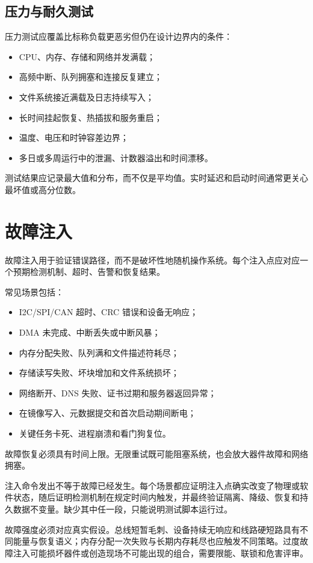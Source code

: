 \subsection{压力与耐久测试}

压力测试应覆盖比标称负载更恶劣但仍在设计边界内的条件：
\begin{itemize}
  \item CPU、内存、存储和网络并发满载；
  \item 高频中断、队列拥塞和连接反复建立；
  \item 文件系统接近满载及日志持续写入；
  \item 长时间挂起恢复、热插拔和服务重启；
  \item 温度、电压和时钟容差边界；
  \item 多日或多周运行中的泄漏、计数器溢出和时间漂移。
\end{itemize}

测试结果应记录最大值和分布，而不仅是平均值。实时延迟和启动时间通常更关心最坏值或高分位数。

\section{故障注入}

故障注入用于验证错误路径，而不是破坏性地随机操作系统。每个注入点应对应一个预期检测机制、超时、告警和恢复结果。

常见场景包括：
\begin{itemize}
  \item I2C/SPI/CAN 超时、CRC 错误和设备无响应；
  \item DMA 未完成、中断丢失或中断风暴；
  \item 内存分配失败、队列满和文件描述符耗尽；
  \item 存储读写失败、坏块增加和文件系统损坏；
  \item 网络断开、DNS 失败、证书过期和服务器返回异常；
  \item 在镜像写入、元数据提交和首次启动期间断电；
  \item 关键任务卡死、进程崩溃和看门狗复位。
\end{itemize}

故障恢复必须具有时间上限。无限重试既可能阻塞系统，也会放大器件故障和网络拥塞。

注入命令发出不等于故障已经发生。每个场景都应证明注入点确实改变了物理或软件状态，随后证明检测机制在规定时间内触发，并最终验证隔离、降级、恢复和持久数据不变量。缺少其中任一段，只能说明测试脚本运行过。

故障强度必须对应真实假设。总线短暂毛刺、设备持续无响应和线路硬短路具有不同能量与恢复语义；内存分配一次失败与长期内存耗尽也应触发不同策略。过度故障注入可能损坏器件或创造现场不可能出现的组合，需要限能、联锁和危害评审。


